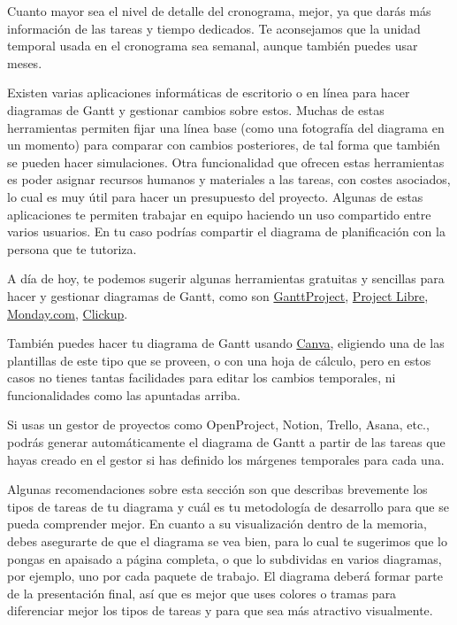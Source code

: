 Cuanto mayor sea el nivel de detalle del cronograma, mejor, ya que darás más información de las tareas y tiempo dedicados. Te aconsejamos que la unidad temporal usada en el cronograma sea semanal, aunque también puedes usar meses. 

Existen varias aplicaciones informáticas de escritorio o en línea para hacer diagramas de Gantt y gestionar cambios sobre estos. Muchas de estas herramientas permiten fijar una línea base (como una fotografía del diagrama en un momento) para comparar con cambios posteriores, de tal forma que también se pueden hacer simulaciones. Otra funcionalidad que ofrecen estas herramientas es poder asignar recursos humanos y materiales a las tareas, con costes asociados, lo cual es muy útil para hacer un presupuesto del proyecto. Algunas de estas aplicaciones te permiten trabajar en equipo haciendo un uso compartido entre varios usuarios. En tu caso podrías compartir el diagrama de planificación con la persona que te tutoriza.

A día de hoy, te podemos sugerir algunas herramientas gratuitas y sencillas para hacer y gestionar diagramas de Gantt, como son \href{https://www.ganttproject.biz/}{GanttProject}, \href{https://www.projectlibre.com/}{Project Libre}, 
 \href{https://www.monday.com}{Monday.com}, \href{https://app.clickup.com/}{Clickup}. 

También puedes hacer tu diagrama de Gantt usando \href{https://www.canva.com/}{Canva}, eligiendo una de las plantillas de este tipo que se proveen, o con una hoja de cálculo, pero en estos casos no tienes tantas facilidades para editar los cambios temporales, ni funcionalidades como las apuntadas arriba. 

Si usas un gestor de proyectos como OpenProject, Notion, Trello, Asana, etc., podrás generar automáticamente el diagrama de Gantt a partir de las tareas que hayas creado en el gestor si has definido los márgenes temporales para cada una.

Algunas recomendaciones sobre esta sección son que describas brevemente los tipos de tareas de tu diagrama y cuál es tu metodología de desarrollo para que se pueda comprender mejor. En cuanto a su visualización dentro de la memoria, debes asegurarte de que el diagrama se vea bien, para lo cual te sugerimos que lo pongas en apaisado a página completa, o que lo subdividas en varios diagramas, por ejemplo, uno por cada paquete de trabajo. El diagrama deberá formar parte de la presentación final, así que es mejor que uses colores o tramas para diferenciar mejor los tipos de tareas y para que sea más atractivo visualmente. 

